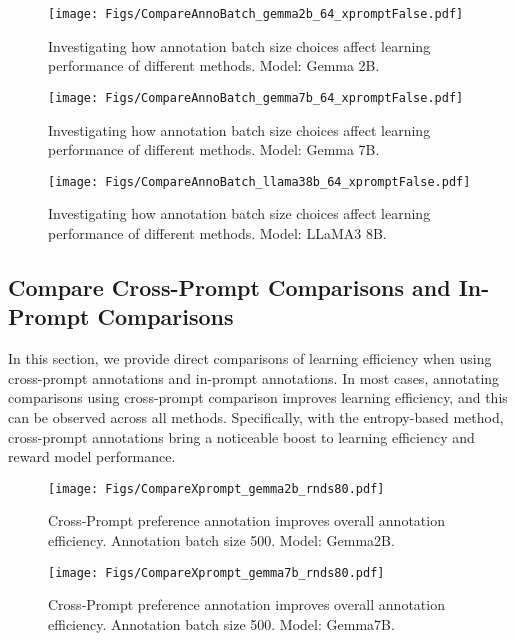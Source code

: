 \begin{figure}[h!]
    \centering
    \texttt{[image: Figs/CompareAnnoBatch\_gemma2b\_64\_xpromptFalse.pdf]}
    \caption{\small Investigating how annotation batch size choices affect learning performance of different methods. Model: Gemma 2B.}
    \label{fig:results_annotation_bs_gemma2b_total}
\end{figure}


\begin{figure}[h!]
    \centering
    \texttt{[image: Figs/CompareAnnoBatch\_gemma7b\_64\_xpromptFalse.pdf]}
    \caption{\small Investigating how annotation batch size choices affect learning performance of different methods. Model: Gemma 7B.}
    \label{fig:results_annotation_bs_gemma7b_total}
\end{figure}

\begin{figure}[h!]
    \centering
    \texttt{[image: Figs/CompareAnnoBatch\_llama38b\_64\_xpromptFalse.pdf]}
    \caption{\small Investigating how annotation batch size choices affect learning performance of different methods. Model: LLaMA3 8B.}
    \label{fig:results_annotation_bs_llama38b_total}
\end{figure}

\newpage
\subsection{Compare Cross-Prompt Comparisons and In-Prompt Comparisons}
\label{appdx:more_results_xprompt-in-prompt_comparison}
In this section, we provide direct comparisons of learning efficiency when using cross-prompt annotations and in-prompt annotations. In most cases, annotating comparisons using cross-prompt comparison improves learning efficiency, and this can be observed across all methods. Specifically, with the entropy-based method, cross-prompt annotations bring a noticeable boost to learning efficiency and reward model performance.

\begin{figure}[h!]
    \centering
    \texttt{[image: Figs/CompareXprompt\_gemma2b\_rnds80.pdf]}
\caption{\small Cross-Prompt preference annotation improves overall annotation efficiency. Annotation batch size 500. Model: Gemma2B.}
    \label{fig:results_xprompt_inprompt_abs500_gemma2b}
\end{figure} 


\begin{figure}[h!]
    \centering
    \texttt{[image: Figs/CompareXprompt\_gemma7b\_rnds80.pdf]}
\caption{\small Cross-Prompt preference annotation improves overall annotation efficiency. Annotation batch size 500. Model: Gemma7B.}
    \label{fig:results_xprompt_inprompt_abs500_gemma7b}
\end{figure} 


